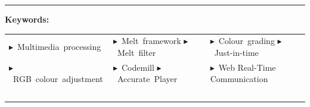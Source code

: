 \documentclass[12pt,a4paper]{article}
\newcommand{\RedVioletTriangleright}{\textcolor{RedViolet}{$\blacktriangleright$}}
\begin{document}
\begin{abstract}
	
	\begin{spacing}{1}


	\noindent This thesis project lays in the field of real-time multimedia processing, focusing on the user-sided adjustment of RGB values in video streaming using  Just-In-Time (JIT) techniques and the Melt framework. 
	This is implemented in Codemill's Accurate Player and using Web Real-Time Communication (WebRTC) as a data channel.
	Colour theory and RGB colour representation is introduced and knowledge of the technical components especially the structure and usage of the Melt framework is given.
	
	
	\noindent The first part of the research question aims to evaluate the feasibility of the real-time colour adjustment.
	The implementation is achievable and described. A comparison of different Melt filters is included, to select the most suitable filter for the RGB adjustment.	
	
	
	\noindent The second part of the research question considers the comparison of video colour grading results with Melt filters, that were applied on different platforms: The Accurate Player, the locally installed Melt framework and KDEN Live. 
	For this, frames of the different platforms were extracted and subtracted from each to show differences in the colour saturations.
	
	\end{spacing}
	
\end{abstract}
{\color{RedViolet}\dotfill}

{\color{RedViolet} \rule{\textwidth}{1pt}}

\vfill

\textbf{Keywords:}



\begin{adjustbox}{width=1\textwidth}
	\begin{tabular}{lll}
		\RedVioletTriangleright~Multimedia~processing & \RedVioletTriangleright~Melt~framework \RedVioletTriangleright~Melt~filter  & \RedVioletTriangleright~Colour~grading \RedVioletTriangleright~Just-in-time  \\
		\RedVioletTriangleright~RGB~colour~adjustment &  \RedVioletTriangleright~Codemill  \RedVioletTriangleright~Accurate~Player &  \RedVioletTriangleright~Web Real-Time Communication
		  \\
		\ & \ & \ \\
	\end{tabular}
\end{adjustbox}
\end{document}

